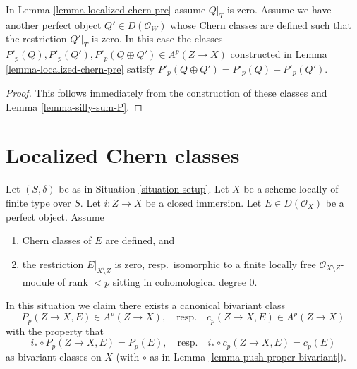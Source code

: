 \begin{lemma}
\label{lemma-localized-chern-pre-sum-P}
In Lemma \ref{lemma-localized-chern-pre} assume $Q|_T$ is zero.
Assume we have another perfect object $Q' \in D(\mathcal{O}_W)$
whose Chern classes are defined such that the restriction $Q'|_T$ is zero.
In this case the classes
$P'_p(Q), P'_p(Q'), P'_p(Q \oplus Q') \in A^p(Z \to X)$
constructed in Lemma \ref{lemma-localized-chern-pre}
satisfy $P'_p(Q \oplus Q') = P'_p(Q) + P'_p(Q')$.
\end{lemma}

\begin{proof}
This follows immediately from the construction of these
classes and Lemma \ref{lemma-silly-sum-P}.
\end{proof}









 
\section{Localized Chern classes}
\label{section-localized-chern}

\noindent
Let $(S, \delta)$ be as in Situation \ref{situation-setup}. Let $X$ be a scheme
locally of finite type over $S$. Let $i : Z \to X$ be a closed immersion.
Let $E \in D(\mathcal{O}_X)$ be a perfect object. Assume
\begin{enumerate}
\item Chern classes of $E$ are defined, and
\item the restriction $E|_{X \setminus Z}$ is zero, resp.\ isomorphic to a
finite locally free $\mathcal{O}_{X \setminus Z}$-module of rank $< p$
sitting in cohomological degree $0$.
\end{enumerate}
In this situation we claim there exists a canonical bivariant class
$$
P_p(Z \to X, E) \in A^p(Z \to X),
\quad\text{resp.}\quad
c_p(Z \to X, E) \in A^p(Z \to X)
$$
with the property that
\begin{equation}
\label{equation-defining-property-localized-classes}
i_* \circ P_p(Z \to X, E) = P_p(E),
\quad\text{resp.}\quad
i_* \circ c_p(Z \to X, E) = c_p(E)
\end{equation}
as bivariant classes on $X$ (with $\circ$ as in
Lemma \ref{lemma-push-proper-bivariant}).

